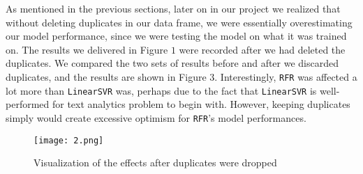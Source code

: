 As mentioned in the previous sections, later on in our project we realized that without deleting duplicates in our data frame, we were essentially overestimating our model performance, since we were testing the model on what it was trained on. The results we delivered in Figure $1$ were recorded after we had deleted the duplicates. We compared the two sets of results before and after we discarded duplicates, and the results are shown in Figure $3$. Interestingly, \texttt{RFR} was affected a lot more than \texttt{LinearSVR} was, perhaps due to the fact that \texttt{LinearSVR} is well-performed for text analytics problem to begin with. However, keeping duplicates simply would create excessive optimism for \texttt{RFR}'s model performances. 
\begin{figure}[htb]

  \centering  %

  \texttt{[image: 2.png]}
 \caption{Visualization of the effects after duplicates were dropped}
  \label{fig:tex}

\end{figure}




